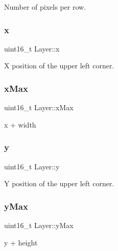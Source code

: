 Number of pixels per row. 

\mbox{\label{group__layer_ga93492d1dfe4b2ba659366efc048f4aa6}} 
\subsubsection{\texorpdfstring{x}{x}}
{\footnotesize\ttfamily uint16\+\_\+t Layer\+::x}



X position of the upper left corner. 

\mbox{\label{group__layer_gabab5e77cc86413440c0a9f99e851269d}} 
\subsubsection{\texorpdfstring{x\+Max}{xMax}}
{\footnotesize\ttfamily uint16\+\_\+t Layer\+::x\+Max}



x + width 

\mbox{\label{group__layer_ga7748abe8164b906fa159c0d57c7b0909}} 
\subsubsection{\texorpdfstring{y}{y}}
{\footnotesize\ttfamily uint16\+\_\+t Layer\+::y}



Y position of the upper left corner. 

\mbox{\label{group__layer_ga005d97fb2216101a65f274f4e8d609d9}} 
\subsubsection{\texorpdfstring{y\+Max}{yMax}}
{\footnotesize\ttfamily uint16\+\_\+t Layer\+::y\+Max}



y + height 

